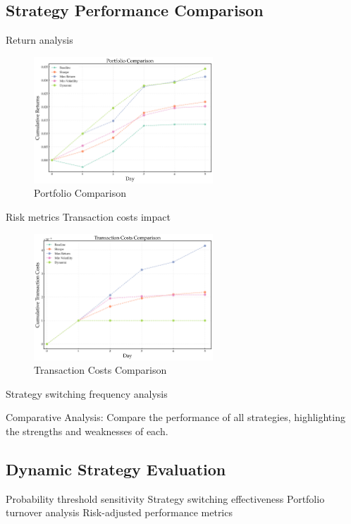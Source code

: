 \subsection{Strategy Performance Comparison}
Return analysis
\begin{figure}[h]
    \centering
    \includegraphics[width=0.6\textwidth]{figures/portfolio_comparison.png}
    \caption{Portfolio Comparison}
    \label{fig:portfolio_comparison}
\end{figure}

Risk metrics
Transaction costs impact

\begin{figure}[h]
    \centering
    \includegraphics[width=0.6\textwidth]{figures/trx_costs_comparison.png}
    \caption{Transaction Costs Comparison}
    \label{fig:trx_costs_comparison}
\end{figure}

Strategy switching frequency analysis


Comparative Analysis:
Compare the performance of all strategies, highlighting the strengths and weaknesses of each.

\subsection{Dynamic Strategy Evaluation}
Probability threshold sensitivity
Strategy switching effectiveness
Portfolio turnover analysis
Risk-adjusted performance metrics

